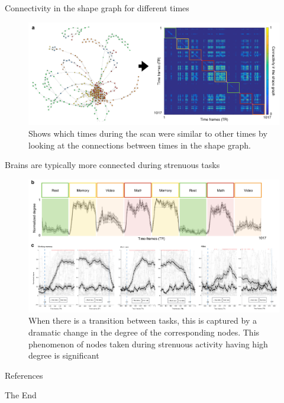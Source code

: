 \documentclass{beamer}
\begin{document}
\begin{frame}{Connectivity in the shape graph for different times}
    \begin{figure}
        \includegraphics[width = 0.95\linewidth]{fig5a.png}
        \caption{Shows which times during the scan were similar to other times by looking at the connections between times in the shape graph.}
    \end{figure}
\end{frame}

\begin{frame}{Brains are typically more connected during strenuous tasks}
    \begin{figure}
        \includegraphics[width = 0.85\linewidth]{fig5b.png}
        \caption{When there is a transition between tasks, this is captured by a dramatic change in the degree of the corresponding nodes. This phenomenon of nodes taken during strenuous activity having high degree is significant}
    \end{figure}
\end{frame}

\begin{frame}{}
    
\end{frame}

\begin{frame}{}
    
\end{frame}

\begin{frame}[allowframebreaks]{References}
\printbibliography
\end{frame}


\begin{frame}
\Huge{\centerline{The End}}
\end{frame}

\end{document}
